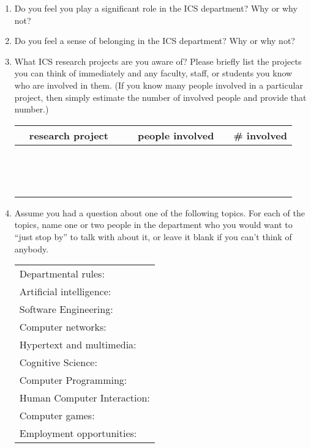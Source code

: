 \begin{enumerate}
\item{Do you feel you play a significant role in the ICS department?  Why
  or why not?}
\\

\item{Do you feel a sense of belonging in the ICS department?  Why or why not?}
\\ 

\item{What ICS research projects are you aware of?  Please briefly list the
  projects you can think of immediately and any faculty, staff, or students
  you know who are involved in them. (If you know many people involved in a
  particular project, then simply estimate the number of involved people
  and provide that number.)}\\
  \begin{tabular}{ccc|ccc|c}
    & research project & & &  people involved    & & \# involved    \\ \hline
    &&&&&&\\ &&&&&&\\ &&&&&&\\ &&&&&&\\ &&&&&&\\ &&&&&&\\ &&&&&&\\ &&&&&&\\
    &&&&&&\\ &&&&&&\\ &&&&&&\\ &&&&&&\\ &&&&&&\\ &&&&&&\\
  \end{tabular}

\item{Assume you had a question about one of the following topics.  For
  each of the topics, name one or two people in the department who you
  would want to ``just stop by'' to talk with about it, or leave it blank
  if you can't think of anybody.}\\
  \begin{tabular}{l}
  Departmental rules: \\
  Artificial intelligence: \\
  Software Engineering: \\
  Computer networks: \\
  Hypertext and multimedia: \\
  Cognitive Science: \\
  Computer Programming: \\
  Human Computer Interaction: \\
  Computer games: \\
  Employment opportunities: \\
  \end{tabular}


\end{enumerate}
